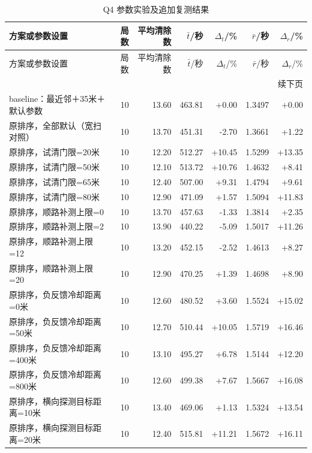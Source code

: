 \begingroup\small\setlength{\tabcolsep}{3pt}
\begin{longtable}{p{}rrrrrr}
\caption{Q4 参数实验及追加复测结果}\label{tab:official-q4-4}\\
\toprule
方案或参数设置 & 局数 & 平均清除数 & $\bar t$/秒 & $\Delta_t$/\% & $\bar r$/秒 & $\Delta_r$/\% \\
\midrule\endfirsthead
\toprule
方案或参数设置 & 局数 & 平均清除数 & $\bar t$/秒 & $\Delta_t$/\% & $\bar r$/秒 & $\Delta_r$/\% \\
\midrule\endhead
\midrule\multicolumn{7}{r}{续下页}\\\endfoot
\bottomrule\endlastfoot
baseline：最近邻＋35米＋默认参数 & 10 & 13.60 & 463.81 & +0.00 & 1.3497 & +0.00 \\
原排序，全部默认（宽扫对照） & 10 & 13.70 & 451.31 & -2.70 & 1.3661 & +1.22 \\
原排序，试清门限=20米 & 10 & 12.20 & 512.27 & +10.45 & 1.5299 & +13.35 \\
原排序，试清门限=50米 & 10 & 12.10 & 513.72 & +10.76 & 1.4632 & +8.41 \\
原排序，试清门限=65米 & 10 & 12.40 & 507.00 & +9.31 & 1.4794 & +9.61 \\
原排序，试清门限=80米 & 10 & 12.90 & 471.09 & +1.57 & 1.5094 & +11.83 \\
原排序，顺路补测上限=0 & 10 & 13.70 & 457.63 & -1.33 & 1.3814 & +2.35 \\
原排序，顺路补测上限=2 & 10 & 13.90 & 440.22 & -5.09 & 1.5017 & +11.26 \\
原排序，顺路补测上限=12 & 10 & 13.20 & 452.15 & -2.52 & 1.4613 & +8.27 \\
原排序，顺路补测上限=20 & 10 & 12.90 & 470.25 & +1.39 & 1.4698 & +8.90 \\
原排序，负反馈冷却距离=0米 & 10 & 12.60 & 480.52 & +3.60 & 1.5524 & +15.02 \\
原排序，负反馈冷却距离=50米 & 10 & 12.70 & 510.44 & +10.05 & 1.5719 & +16.46 \\
原排序，负反馈冷却距离=400米 & 10 & 13.10 & 495.27 & +6.78 & 1.5144 & +12.20 \\
原排序，负反馈冷却距离=800米 & 10 & 12.60 & 499.38 & +7.67 & 1.5667 & +16.08 \\
原排序，横向探测目标距离=10米 & 10 & 13.40 & 469.06 & +1.13 & 1.5324 & +13.54 \\
原排序，横向探测目标距离=20米 & 10 & 12.40 & 515.81 & +11.21 & 1.5672 & +16.11 \\

\end{longtable}
